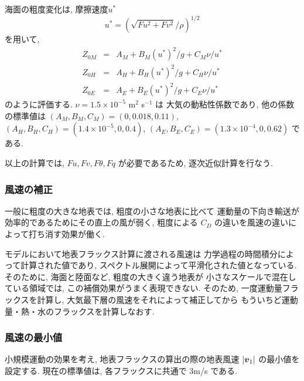 海面の粗度変化は, 摩擦速度$u^*$
\begin{equation}
  u^* = \left( \sqrt{Fu^2 + Fv^2}/\rho \right)^{1/2}
\end{equation}
を用いて,
\begin{eqnarray}
  Z_{0M} & = & A_M + B_M (u^*)^2/g + C_M \nu/u^* \\
  Z_{0H} & = & A_H + B_H (u^*)^2/g + C_H \nu/u^* \\
  Z_{0E} & = & A_E + B_E (u^*)^2/g + C_E \nu/u^* 
\end{eqnarray}
のように評価する. $\nu=1.5\times10^{-5}$ m$^2$ s$^{-1}$ は
大気の動粘性係数であり, 
他の係数の標準値は
$(A_M, B_M, C_M) = (0, 0.018, 0.11) $,
$(A_H, B_H, C_H) = (1.4\times10^{-5}, 0, 0.4) $,
$(A_E, B_E, C_E) = (1.3\times10^{-4}, 0, 0.62) $ である.

以上の計算では, $Fu, Fv, F\theta, Fq$ が必要であるため,
逐次近似計算を行なう.

\subsubsection{風速の補正}

一般に粗度の大きな地表では, 粗度の小さな地表に比べて
運動量の下向き輸送が効率的であるためにその直上の風が弱く,
粗度による $C_D$ の違いを風速の違いによって打ち消す効果が働く.

モデルにおいて地表フラックス計算に渡される風速は
力学過程の時間積分によって計算された値であり,
スペクトル展開によって平滑化された値となっている.
そのために, 海面と陸面など, 粗度の大きく違う地表が
小さなスケールで混在している領域では, 
この補償効果がうまく表現できない.
そのため, 一度運動量フラックスを計算し,
大気最下層の風速をそれによって補正してから
もういちど運動量・熱・水のフラックスを計算しなおす.

\subsubsection{風速の最小値}

小規模運動の効果を考え,
地表フラックスの算出の際の地表風速
$|\Dvect{v}_1|$ の最小値を設定する.
現在の標準値は, 各フラックスに共通で
3m/s である.

